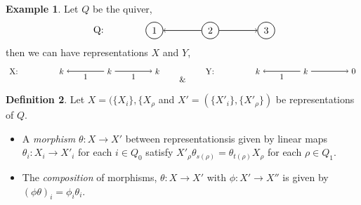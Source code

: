 \documentclass[11.5pt, twoside, a4paper, titlepage]{report}
\theoremstyle{definition}
\newtheorem{mydef}{Definition}[section]
\newtheorem{eg}[mydef]{Example}
\theoremstyle{plain}
\begin{document}
\begin{eg} \label{repseg}
Let $Q$ be the quiver, 
\begin{equation*}
\begin{tikzpicture}[->,-latex, auto, every path/.style={->, semithick}, main node/.style={draw, circle}]
\node []			(0) at (-2,0)		{Q:};
\node	[main node]		(1) at (0,0)		{1};
\node [main node]		(2) at (2,0)		{2};
\node [main node]		(3) at (4,0)		{3};

\draw (2) edge (1);
\draw (2) edge (3);
\end{tikzpicture}
\end{equation*}
then we can have representations $X$ and $Y$, 
\begin{equation*}
\begin{tikzpicture}[->,-latex, auto, every path/.style={->, semithick}, main node/.style={draw, circle}]
\node []		(0) at (-2,0)		{X:};
\node	[]		(1) at (0,0)		{$k$};
\node []		(2) at (2,0)		{$k$};
\node []		(3) at (4,0)		{$k$};

\draw (2) edge node [auto, swap] {$$} node [auto] {1} (1);
\draw (2) edge node [auto] {$$} node [auto, swap] {1} (3);
\end{tikzpicture}
\qquad \& \qquad
\begin{tikzpicture}[->,-latex, auto, every path/.style={->, semithick}, main node/.style={draw, circle}]
\node []			(0) at (-2,0)		{Y:};
\node	[]		(1) at (0,0)		{$k$};
\node []		(2) at (2,0)		{$k$};
\node []		(3) at (4,0)		{$0$};

\draw (2) edge node [auto, swap] {$$} node [auto] {1} (1);
\draw (2) edge node [auto] {$$} (3);
\end{tikzpicture}
\end{equation*}
\end{eg}

\begin{mydef}
Let $X=(\{X_i\}, \{X_{\rho}$ and $X'=(\{X'_i\}, \{X'_{\rho}\})$ be representations of $Q$. 
\begin{itemize}
\item A \emph{morphism} $\theta: X \to X'$ between representationsis given by linear maps $\theta_i:X_i \to X'_i$ for each $i\in Q_0$ satisfy $X'_{\rho}\theta _{s(\rho)} = \theta_{t(\rho)}X_{\rho}$ for each $\rho \in Q_1$. 
\item The \emph{composition} of morphisms, $\theta: X \to X'$ with $\phi: X' \to X''$ is given by $(\phi \theta)_i=\phi_i \theta_i$.
\end{itemize}
\end{mydef}
\end{document}
